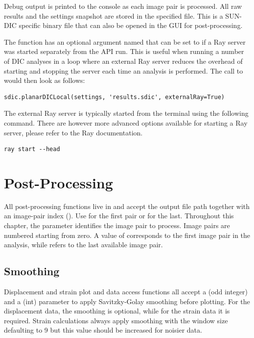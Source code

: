 Debug output is printed to the console as each image pair is processed.  All raw results and the settings snapshot are stored in the specified  file.  This is a SUN-DIC specific binary file that can also be opened in the GUI for post-processing.

The  function has an optional argument named  that can be set to  if a Ray server was started separately from the API run.  This is useful when running a number of DIC analyses in a loop where an external Ray server reduces the overhead of starting and stopping the server each time an analysis is performed.  The call to  would then look as follows:

\begin{lstlisting}
sdic.planarDICLocal(settings, 'results.sdic', externalRay=True)
\end{lstlisting}

The external Ray server is typically started from the terminal using the following command.  There are however more advanced options available for starting a Ray server, please refer to the Ray documentation.

\begin{lstlisting}
ray start --head
\end{lstlisting}


\section{Post-Processing}

All post-processing functions live in  and accept the
output file path together with an image-pair index ().
Use  for the first pair or  for the last. Throughout this chapter, the parameter  identifies the image pair to process. Image pairs are numbered starting from zero. A value of  corresponds to the first image pair in the analysis, while  refers to the last available image pair.

\subsection{Smoothing}

Displacement and strain plot and data access functions all accept a  (odd integer) and a  (int) parameter to apply Savitzky-Golay smoothing before plotting.  For the displacement data, the smoothing is optional, while for the strain data it is required.  Strain calculations always apply smoothing with the window size defaulting to 9 but this value should be increased for noisier data.


